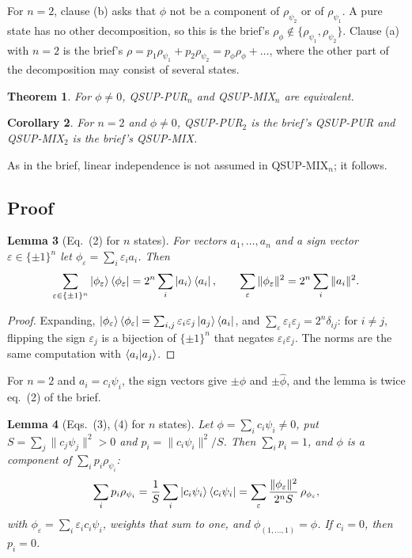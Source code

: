\documentclass[11pt]{article}
\newtheorem{theorem}{Theorem}[section]
\newtheorem{lemma}[theorem]{Lemma}
\newtheorem{corollary}[theorem]{Corollary}
\theoremstyle{definition}
\theoremstyle{remark}
\begin{document}
For $n = 2$, clause (b) asks that $\phi$ not be a component of $\rho_{\psi_2}$ or of
$\rho_{\psi_1}$. A pure state has no other decomposition, so this is the brief's
$\rho_\phi \notin \{\rho_{\psi_1}, \rho_{\psi_2}\}$. Clause (a) with $n = 2$ is the brief's
$\rho = p_1\rho_{\psi_1} + p_2\rho_{\psi_2} = p_\phi\rho_\phi + \dots$, where the other part of the
decomposition may consist of several states.

\begin{theorem}\label{thm:many}
  For $\phi \ne 0$, QSUP-PUR$_n$ and QSUP-MIX$_n$ are equivalent.
\end{theorem}

\begin{corollary}\label{cor:two}
  For $n = 2$ and $\phi \ne 0$, QSUP-PUR$_2$ is the brief's QSUP-PUR and QSUP-MIX$_2$ is the brief's
  QSUP-MIX.
\end{corollary}

As in the brief, linear independence is not assumed in QSUP-MIX$_n$; it follows.

\subsection{Proof}

\begin{lemma}[Eq.~(2) for $n$ states]\label{lem:signs}
  For vectors $a_1, \dots, a_n$ and a sign vector $\varepsilon \in \{\pm1\}^n$ let
  $\phi_\varepsilon = \sum_i \varepsilon_i a_i$. Then
  \[
    \sum_{\varepsilon \in \{\pm1\}^n} \ket{\phi_\varepsilon}\bra{\phi_\varepsilon}
      = 2^n \sum_i \ket{a_i}\bra{a_i},
    \qquad
    \sum_{\varepsilon} \|\phi_\varepsilon\|^2 = 2^n \sum_i \|a_i\|^2.
  \]
\end{lemma}

\begin{proof}
  Expanding, $\ket{\phi_\varepsilon}\bra{\phi_\varepsilon} = \sum_{i,j} \varepsilon_i\varepsilon_j
  \ket{a_j}\bra{a_i}$, and $\sum_\varepsilon \varepsilon_i\varepsilon_j = 2^n\delta_{ij}$: for
  $i \ne j$, flipping the sign $\varepsilon_j$ is a bijection of $\{\pm1\}^n$ that negates
  $\varepsilon_i\varepsilon_j$. The norms are the same computation with $\braket{a_i|a_j}$.
\end{proof}

For $n = 2$ and $a_i = c_i\psi_i$, the sign vectors give $\pm\phi$ and $\pm\hat\phi$, and the lemma
is twice eq.~(2) of the brief.

\begin{lemma}[Eqs.~(3), (4) for $n$ states]\label{lem:weights}
  Let $\phi = \sum_i c_i\psi_i \ne 0$, put $S = \sum_j \|c_j\psi_j\|^2 > 0$ and
  $p_i = \|c_i\psi_i\|^2 / S$. Then $\sum_i p_i = 1$, and $\phi$ is a component of
  $\sum_i p_i\rho_{\psi_i}$:
  \[
    \sum_i p_i\rho_{\psi_i} = \frac1S \sum_i \ket{c_i\psi_i}\bra{c_i\psi_i}
      = \sum_\varepsilon \frac{\|\phi_\varepsilon\|^2}{2^n S}\,\rho_{\phi_\varepsilon},
  \]
  with $\phi_\varepsilon = \sum_i \varepsilon_i c_i\psi_i$, weights that sum to one, and
  $\phi_{(1,\dots,1)} = \phi$. If $c_i = 0$, then $p_i = 0$.
\end{lemma}
\end{document}
